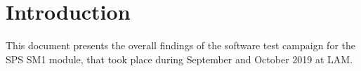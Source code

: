 \section{Introduction}

This document presents the overall findings of the software test campaign for the SPS SM1
module, that took place during September and October 2019 at LAM.
